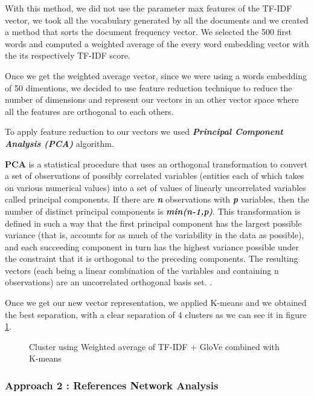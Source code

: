 \documentclass[article,twocolumn]{IEEEtran}
\begin{document}
With this method, we did not use the parameter max features of the
TF-IDF vector, we took all the vocabulary generated by all the documents
and we created a method that sorts the document frequency vector. We
selected the 500 first words and computed a weighted average of the
every word embedding vector with the its respectively TF-IDF score.

Once we get the weighted average vector, since we were using a words
embedding of 50 dimentions, we decided to use feature reduction
technique to reduce the number of dimensions and represent our vectors
in an other vector space where all the features are orthogonal to each
others.

To apply feature reduction to our vectors we used
\textbf{\emph{Principal Component Analysis (PCA)}} algorithm.

\textbf{PCA} is a statistical procedure that uses an orthogonal
transformation to convert a set of observations of possibly correlated
variables (entities each of which takes on various numerical values)
into a set of values of linearly uncorrelated variables called principal
components. If there are \textbf{\emph{n}} observations with
\textbf{\emph{p}} variables, then the number of distinct principal
components is \textbf{\emph{min(n-1,p)}}. This transformation is defined
in such a way that the first principal component has the largest
possible variance (that is, accounts for as much of the variability in
the data as possible), and each succeeding component in turn has the
highest variance possible under the constraint that it is orthogonal to
the preceding components. The resulting vectors (each being a linear
combination of the variables and containing n observations) are an
uncorrelated orthogonal basis set. \cite{PCA}.

Once we get our new vector representation, we applied K-means and we
obtained the best separation, with a clear separation of 4 clusters as
we can see it in figure \ref{fig5}.


    \begin{figure}
        \begin{center}\end{center}
        \caption{Cluster using Weighted average of TF-IDF + GloVe  combined with K-means }
        \label{fig5}
    \end{figure}
    
    \hypertarget{approach-2-references-network-analysis}{%
\subsubsection{Approach 2 : References Network
Analysis}\label{approach-2-references-network-analysis}}
\end{document}
